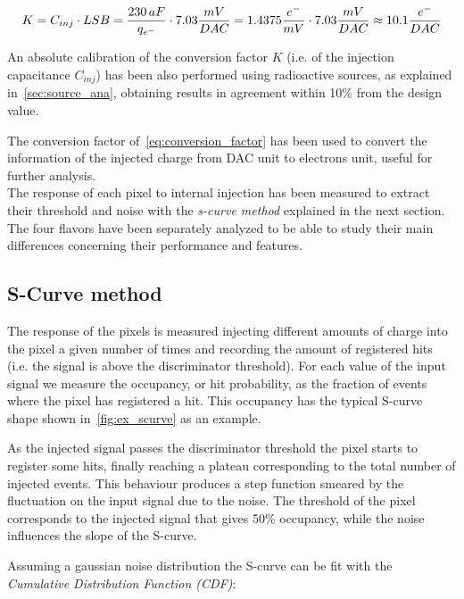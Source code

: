 \begin{equation}
\small
K = C_{inj} \cdot LSB = \frac{230 \, aF}{q_{{e}^{-}}} \cdot 7.03 \frac{mV}{DAC}= 1.4375 \frac{e^{-}}{mV} \cdot 7.03 \frac{mV}{DAC} \approx 10.1 \frac{e^{-}}{DAC}  
\label{eq:conversion_factor}
\end{equation}


An absolute calibration of the conversion factor $K$ (i.e. of the injection capacitance $C_{inj}$) has been also performed using radioactive sources, as explained in~\autoref{sec:source_ana}, obtaining results in agreement within 10$\%$ from the design value. 

The conversion factor of~\autoref{eq:conversion_factor} has been used to convert the information of the injected charge from DAC unit to electrons unit, useful for further analysis.
\\
The response of each pixel to internal injection has been measured to extract their threshold and noise with the \textit{s-curve method} explained in the next section. 
The four flavors have been separately analyzed to be able to study their main differences concerning their performance and features. 


\subsection{S-Curve method} \label{sec:threshold_subsection}

The response of the pixels is measured injecting different amounts of charge into the pixel a given number of times and recording the amount of registered hits (i.e. the signal is above the discriminator threshold). For each value of the input signal we measure the occupancy, or hit probability, as the fraction of events where the pixel has registered a hit. This occupancy has the typical S-curve shape shown in~\autoref{fig:ex_scurve} as an example. 

As the injected signal passes the discriminator threshold the pixel starts to register some hits, finally reaching a plateau corresponding to the total number of injected events. This behaviour produces a step function smeared by the fluctuation on the input signal due to the noise.  
The threshold of the pixel corresponds to the injected signal  that gives 50\% occupancy, while the noise influences the slope of the S-curve.  

Assuming a gaussian noise distribution the S-curve can be fit with the \textit{Cumulative Distribution Function (CDF)}:


